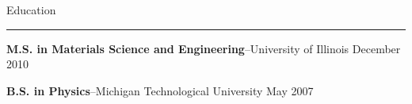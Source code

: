 \documentclass[10pt]{article}
\newcommand{\bigsection}[1]{	
	\vspace{4pt}
	{\fontfamily{phv}\selectfont\Large#1}

	\vspace{-10pt} \rule{\textwidth}{1pt}
}
\begin{document}
\bigsection{Education}

\vspace{-10pt}

\textbf{M.S. in Materials Science and Engineering}--University of Illinois \hfill December 2010

\textbf{B.S. in Physics}--Michigan Technological University \hfill May 2007

\end{document}
